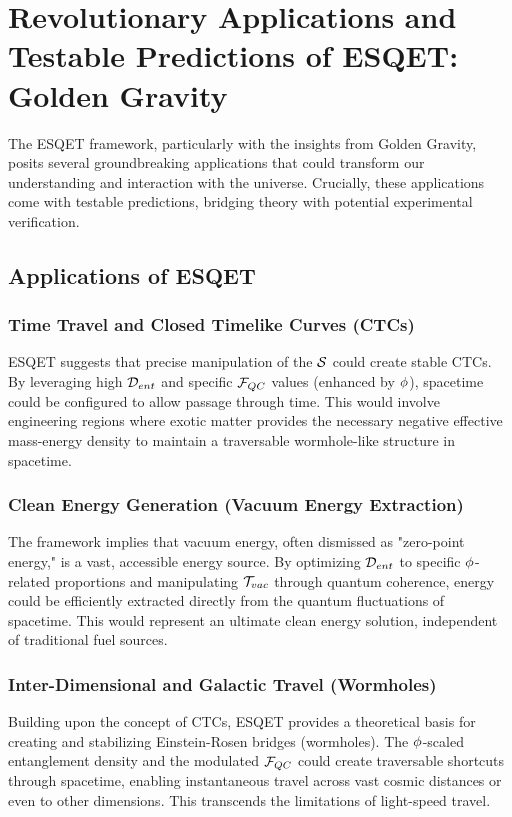 \chapter{Revolutionary Applications and Testable Predictions of ESQET: Golden Gravity}
\label{ch:applications_predictions}

The ESQET framework, particularly with the insights from Golden Gravity, posits several groundbreaking applications that could transform our understanding and interaction with the universe. Crucially, these applications come with testable predictions, bridging theory with potential experimental verification.

\section{Applications of ESQET}

\subsection{Time Travel and Closed Timelike Curves (CTCs)}
ESQET suggests that precise manipulation of the $\mathcal{S}$ could create stable CTCs. By leveraging high $\mathcal{D}_{ent}$ and specific $\mathcal{F}_{QC}$ values (enhanced by $\phi$), spacetime could be configured to allow passage through time. This would involve engineering regions where exotic matter provides the necessary negative effective mass-energy density to maintain a traversable wormhole-like structure in spacetime.

\subsection{Clean Energy Generation (Vacuum Energy Extraction)}
The framework implies that vacuum energy, often dismissed as "zero-point energy," is a vast, accessible energy source. By optimizing $\mathcal{D}_{ent}$ to specific $\phi$-related proportions and manipulating $\mathcal{T}_{vac}$ through quantum coherence, energy could be efficiently extracted directly from the quantum fluctuations of spacetime. This would represent an ultimate clean energy solution, independent of traditional fuel sources.

\subsection{Inter-Dimensional and Galactic Travel (Wormholes)}
Building upon the concept of CTCs, ESQET provides a theoretical basis for creating and stabilizing Einstein-Rosen bridges (wormholes). The $\phi$-scaled entanglement density and the modulated $\mathcal{F}_{QC}$ could create traversable shortcuts through spacetime, enabling instantaneous travel across vast cosmic distances or even to other dimensions. This transcends the limitations of light-speed travel.

